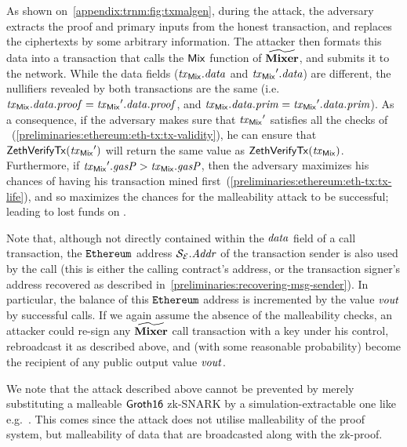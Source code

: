 As shown on~\cref{appendix:trnm:fig:txmalgen}, during the attack, the adversary extracts the proof and primary inputs from the honest transaction, and replaces the ciphertexts by some arbitrary information.
The attacker then formats this data into a transaction that calls the $\mathsf{Mix}$ function of $\widetilde{\mathbf{Mixer}}$, and submits it to the network.
While the data fields ($\mathit{\mathit{tx}_{\mathsf{Mix}}}.\mathit{data}$ and $\mathit{\mathit{tx}_{\mathsf{Mix}}}'.\mathit{data}$) are different, the nullifiers revealed by both transactions are the same (i.e.~$\mathit{\mathit{tx}_{\mathsf{Mix}}}.\mathit{data}.\mathit{proof} = \mathit{\mathit{tx}_{\mathsf{Mix}}}'.\mathit{data}.\mathit{proof}$, and $\mathit{\mathit{tx}_{\mathsf{Mix}}}.\mathit{data}.\mathit{prim} = \mathit{\mathit{tx}_{\mathsf{Mix}}}'.\mathit{data}.\mathit{prim}$).
As a consequence, if the adversary makes sure that $\mathit{\mathit{tx}_{\mathsf{Mix}}}'$ satisfies all the checks of \ethVerifyTx{}~(\cref{preliminaries:ethereum:eth-tx:tx-validity}), he can ensure that $\mathsf{ZethVerifyTx}(\mathit{\mathit{tx}_{\mathsf{Mix}}}')$ will return the same value as $\mathsf{ZethVerifyTx}(\mathit{\mathit{tx}_{\mathsf{Mix}}})$.
Furthermore, if $\mathit{\mathit{tx}_{\mathsf{Mix}}}'.\mathit{gasP} > \mathit{\mathit{tx}_{\mathsf{Mix}}}.\mathit{gasP}$, then the adversary maximizes his chances of having his transaction mined first~(\cref{preliminaries:ethereum:eth-tx:tx-life}), and so maximizes the chances for the malleability attack to be successful; leading to lost funds on \mixer.

\begin{remark}\label{appendix:trnm:resign-tx-attack}
  Note that, although not directly contained within the $\mathit{data}$ field of a \mixer{} call transaction, the $\texttt{Ethereum}{}$ address $\mathcal{{S}_{E}}.\mathit{Addr}$ of the transaction sender is also used by the \mixer{} call (this is either the calling contract's address, or the transaction signer's address recovered as described in~\cref{preliminaries:recovering-msg-sender}). In particular, the balance of this $\texttt{Ethereum}{}$ address is incremented by the value $\mathit{vout}$ by successful \mix{} calls.
  If we again assume the absence of the malleability checks, an attacker could re-sign any $\widetilde{\mathbf{Mixer}}$ call transaction with a key under his control, rebroadcast it as described above, and (with some reasonable probability) become the recipient of any public output value $\mathit{vout}$.
\end{remark}

\begin{remark}
  We note that the attack described above cannot be prevented by merely substituting a malleable $\mathsf{Groth16}$ zk-SNARK by a simulation-extractable one like e.g.~\cite{groth2017simulation}. This comes since the attack does not utilise malleability of the proof system, but malleability of data that are broadcasted along with the zk-proof.
\end{remark}

